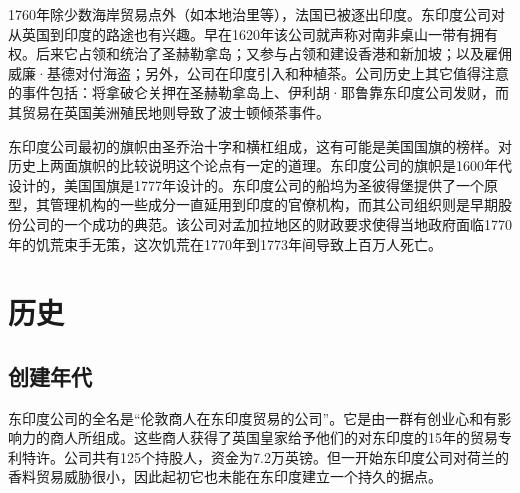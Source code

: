 \documentclass{ctexbook}
\begin{document}
1760年除少数海岸贸易点外（如本地治里等），法国已被逐出印度。东印度公司对从英国到印度的路途也有兴趣。早在1620年该公司就声称对南非桌山一带有拥有权。后来它占领和统治了圣赫勒拿岛；又参与占领和建设香港和新加坡；以及雇佣威廉·基德对付海盗；另外，公司在印度引入和种植茶。公司历史上其它值得注意的事件包括：将拿破仑关押在圣赫勒拿岛上、伊利胡·耶鲁靠东印度公司发财，而其贸易在英国美洲殖民地则导致了波士顿倾茶事件。
\begin{figure}[!h]
    \begin{floatrow}
    \end{floatrow}
\end{figure}

东印度公司最初的旗帜由圣乔治十字和横杠组成，这有可能是美国国旗的榜样。对历史上两面旗帜的比较说明这个论点有一定的道理。东印度公司的旗帜是1600年代设计的，美国国旗是1777年设计的。东印度公司的船坞为圣彼得堡提供了一个原型，其管理机构的一些成分一直延用到印度的官僚机构，而其公司组织则是早期股份公司的一个成功的典范。该公司对孟加拉地区的财政要求使得当地政府面临1770年的饥荒束手无策，这次饥荒在1770年到1773年间导致上百万人死亡。


\section{历史}
\subsection{创建年代}
东印度公司的全名是“伦敦商人在东印度贸易的公司”。它是由一群有创业心和有影响力的商人所组成。这些商人获得了英国皇家给予他们的对东印度的15年的贸易专利特许。公司共有125个持股人，资金为7.2万英镑。但一开始东印度公司对荷兰的香料贸易威胁很小，因此起初它也未能在东印度建立一个持久的据点。
\end{document}
